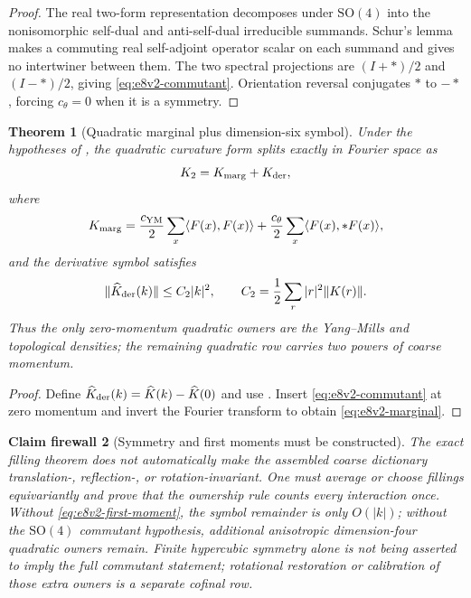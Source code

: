 \documentclass[11pt,oneside]{book}
\newtheorem{theorem}{Theorem}[chapter]
\newtheorem{firewall}[theorem]{Claim firewall}
\theoremstyle{definition}
\theoremstyle{remark}
\begin{document}
\begin{proof}
The real two-form representation decomposes under
\(\mathrm{SO}(4)\) into the nonisomorphic self-dual and anti-self-dual
irreducible summands.  Schur's lemma makes a commuting real
self-adjoint operator scalar on each summand and gives no intertwiner
between them.  The two spectral
projections are \((I+*)/2\) and \((I-*)/2\), giving
\eqref{eq:e8v2-commutant}.  Orientation reversal conjugates
\(*\) to \(-*\), forcing \(c_\theta=0\) when it is a symmetry.
\end{proof}

\begin{theorem}[Quadratic marginal plus dimension-six symbol]
\label{thm:e8v2-marginal}
Under the hypotheses of
, the quadratic curvature
form splits exactly in Fourier space as
\[
 K_2=K_{\rm marg}+K_{\rm der},                       \label{eq:e8v2-marginal-split}
\]
where
\[
 K_{\rm marg}
 =
 \frac{c_{\rm YM}}2\sum_x\langle F(x),F(x)\rangle
 +
 \frac{c_\theta}2\sum_x\langle F(x),*F(x)\rangle,    \label{eq:e8v2-marginal}
\]
and the derivative symbol satisfies
\[
 \|\widehat K_{\rm der}(k)\|
 \leq C_2|k|^2,\qquad
 C_2=\frac12\sum_r|r|^2\|K(r)\|.                    \label{eq:e8v2-derivative}
\]
Thus the only zero-momentum quadratic owners are the Yang--Mills and
topological densities; the remaining quadratic row carries two
powers of coarse momentum.
\end{theorem}

\begin{proof}
Define
\(\widehat K_{\rm der}(k)=\widehat K(k)-\widehat K(0)\) and use
.  Insert
\eqref{eq:e8v2-commutant} at zero momentum and invert the Fourier
transform to obtain \eqref{eq:e8v2-marginal}.
\end{proof}

\begin{firewall}[Symmetry and first moments must be constructed]
\label{fire:e8v2-symmetry}
The exact filling theorem does not automatically make the assembled
coarse dictionary translation-, reflection-, or rotation-invariant.
One must average or choose fillings equivariantly and prove that the
ownership rule counts every interaction once.  Without
\eqref{eq:e8v2-first-moment}, the symbol remainder is only \(O(|k|)\);
without the \(\mathrm{SO}(4)\) commutant hypothesis, additional
anisotropic dimension-four quadratic owners remain.  Finite
hypercubic symmetry alone is not being asserted to imply the full
commutant statement; rotational restoration or calibration of those
extra owners is a separate cofinal row.
\end{firewall}
\end{document}
